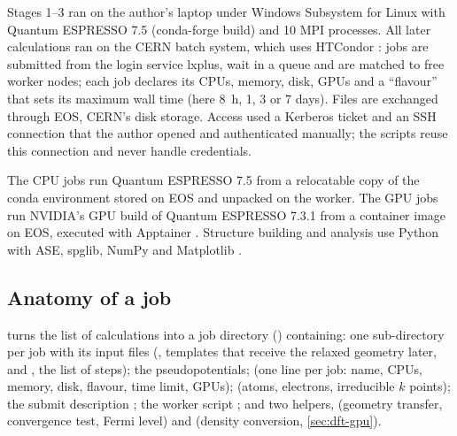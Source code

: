Stages 1--3 ran on the author's laptop under Windows Subsystem for Linux with Quantum ESPRESSO 7.5 (conda-forge build)
and 10 MPI processes. All later calculations ran on the CERN batch system, which uses HTCondor \citep{Thain2005}: jobs
are submitted from the login service lxplus, wait in a queue and are matched to free worker nodes; each job declares its
CPUs, memory, disk, GPUs and a ``flavour'' that sets its maximum wall time (here 8~h, 1, 3 or 7 days). Files are
exchanged through EOS, CERN's disk storage. Access used a Kerberos ticket and an SSH connection that the author opened
and authenticated manually; the scripts reuse this connection and never handle credentials.

The CPU jobs run Quantum ESPRESSO 7.5 from a relocatable copy of the conda environment stored on EOS and unpacked on the
worker. The GPU jobs run NVIDIA's GPU build of Quantum ESPRESSO 7.3.1 \citep{NvidiaQE} from a container image on EOS,
executed with Apptainer \citep{Kurtzer2017}. Structure building and analysis use Python with ASE, spglib, NumPy
\citep{Harris2020} and Matplotlib \citep{Hunter2007}.

\subsection{Anatomy of a job}
\label{sec:dft-driver}

 turns the list of calculations into a job directory () containing: one
sub-directory per job with its input files (, templates  that receive the relaxed geometry
later, and , the list of steps); the pseudopotentials;  (one line per job: name, CPUs,
memory, disk, flavour, time limit, GPUs);  (atoms, electrons, irreducible $k$ points); the submit
description ; the worker script ; and two helpers,  (geometry transfer,
convergence test, Fermi level) and  (density conversion, \cref{sec:dft-gpu}).

